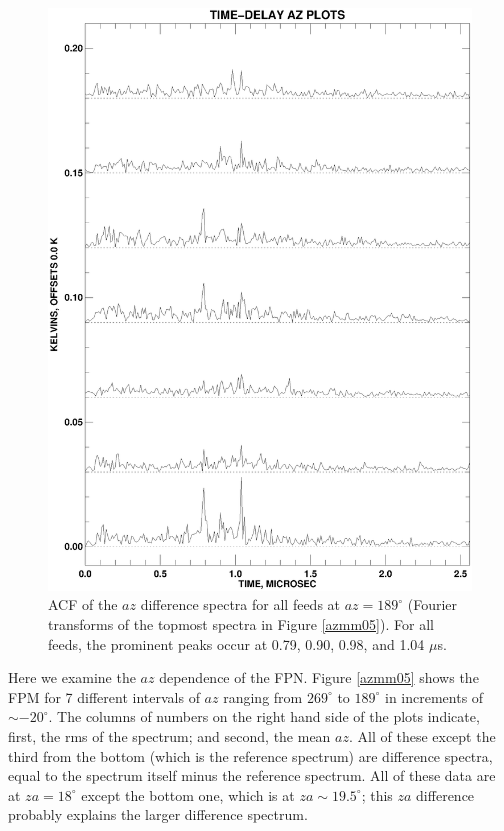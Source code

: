 \documentclass[psfig,preprint]{aastex}
\begin{document}
\begin{figure}[!p]
\begin{center}
\includegraphics[width=6in]{azmmplot_ft.ps}   
\end{center}
\caption{ACF of the $az$ difference spectra for all
feeds at $az=189^\circ$ (Fourier transforms of the topmost spectra in
Figure \ref{azmm05}). For all feeds, the prominent peaks occur at
0.79, 0.90, 0.98, and 1.04 $\mu$s. 
\label{azmm_ft}}
\end{figure}

	Here we examine the $az$ dependence of the FPN.  Figure
\ref{azmm05} shows the FPM for 7 different intervals of $az$ ranging
from $269^\circ$ to $189^\circ$ in increments of $\sim -20^\circ$.  The
columns of numbers on the right hand side of the plots indicate, first,
the rms of the spectrum; and second, the mean $az$.  All of these except
the third from the bottom (which is the reference spectrum) are
difference spectra, equal to the spectrum itself minus the reference
spectrum.  All of these data are at $za=18^\circ$ except the bottom one,
which is at $za \sim 19.5^\circ$; this $za$ difference probably
explains the larger difference spectrum. 
\end{document}
